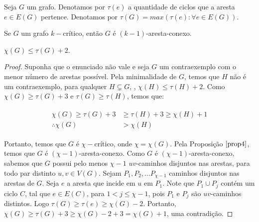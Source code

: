 \documentclass[12pt]{article}
\begin{document}

{
\begin{defi}
	Seja $G$ um grafo. Denotamos por $\tau(e)$ a quantidade de ciclos que a aresta $e \in E(G)$ pertence. Denotamos por $\tau(G) = max(\tau(e): \forall e \in E(G))$.
\end{defi} \newbegin

\begin{prop}
	\label{prop4}
	Se $G$ um grafo $k-$crítico, então $G$ é $(k-1)$-aresta-conexo.
\end{prop}\newbegin

\begin{teo}
	$\chi(G) \leq \tau(G) + 2$.
\end{teo}

\begin{proof}
	Suponha que o enunciado não vale e seja $G$ um contraexemplo com o menor número de arestas possível. Pela minimalidade de $G$, temos que $H$ não é um contraexemplo, para qualquer $H \subsetneq G$, \ie, $\chi(H) \leq \tau(H) + 2$. Como $\chi(G) \geq \tau(G) + 3$ e $\tau(G) \geq \tau(H)$, temos que:
	
	\begin{align}
		\begin{split}
			\chi(G) \geq \tau(G) + 3 &\geq \tau(H) + 3 \geq \chi(H) + 1 \\
			\therefore \chi(G) &> \chi(H)
		\end{split} 
	\end{align}
	
	Portanto, temos que $G$ é $\chi-$crítico, onde $\chi = \chi(G)$. Pela Proposição $\ref{prop4}$, temos que $G$ é $(\chi - 1)$-aresta-conexo. Como $G$ é $(\chi - 1)$-aresta-conexo, sabemos que $G$ possui pelo menos $\chi - 1$ $uv$-caminhos disjuntos nas arestas, para todo par distinto $u, v \in V(G)$. Sejam $P_1, P_2, \ldots P_{\chi - 1}$ caminhos disjuntos nas arestas de $G$. Seja $e$ a aresta que incide em $u$ em $P_1$. Note que $P_1 \cup P_j$ contém um ciclo $C$, tal que $e \in E(C)$, para $1 < j \leq \chi - 1$, pois $P_1$ e $P_j$ são $uv$-caminhos distintos. Logo $\tau(G) \geq \tau(e) \geq \chi(G) - 2$. Portanto, $\chi(G) \geq \tau(G) + 3 \geq \chi(G) - 2 + 3 = \chi(G) + 1$, uma contradição.
	
\end{proof}
}
 
\end{document}
